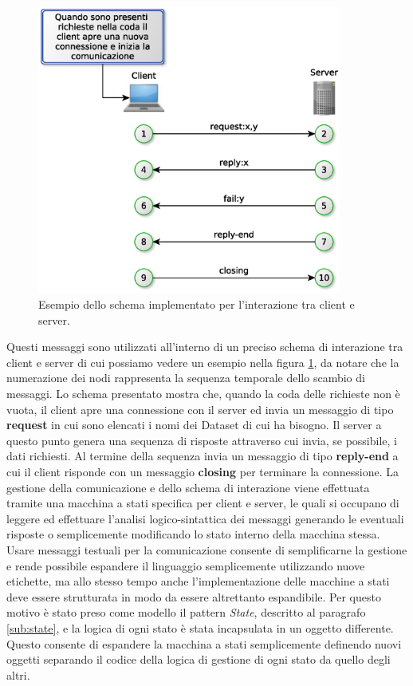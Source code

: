 \begin{figure}[t]
\begin{center}
\includegraphics[width=10cm]{Immagini/InterazioniClientServer}
\caption{Esempio dello schema implementato per l'interazione tra client e server.\label{f:clientserverinteraction}} 
\end{center} 
\end{figure}

Questi messaggi sono utilizzati all'interno di un preciso schema di interazione tra client e server di cui possiamo vedere un esempio nella figura \ref{f:clientserverinteraction}, da notare che la numerazione dei nodi rappresenta la sequenza temporale dello scambio di messaggi. Lo schema presentato mostra che, quando la coda delle richieste non \`e vuota, il client apre una connessione con il server ed invia un messaggio di tipo \textbf{request} in cui sono elencati i nomi dei Dataset di cui ha bisogno. Il server a questo punto genera una sequenza di risposte attraverso cui invia, se possibile, i dati richiesti. Al termine della sequenza invia un messaggio di tipo \textbf{reply-end} a cui il client risponde con un messaggio \textbf{closing} per terminare la connessione. La gestione della comunicazione e dello schema di interazione viene effettuata tramite una macchina a stati specifica per client e server, le quali si occupano di leggere ed effettuare l'analisi logico-sintattica dei messaggi generando le eventuali risposte o semplicemente modificando lo stato interno della macchina stessa. 
Usare messaggi testuali per la comunicazione consente di semplificarne la gestione e rende possibile espandere il linguaggio semplicemente utilizzando nuove etichette, ma allo stesso tempo anche l'implementazione delle macchine a stati deve essere strutturata in modo da essere altrettanto espandibile.
Per questo motivo \`e stato preso come modello il pattern \textit{State}, descritto al paragrafo \ref{sub:state}, e la logica di ogni stato \`e stata incapsulata in un oggetto differente. Questo consente di espandere la macchina a stati semplicemente definendo nuovi oggetti separando il codice della logica di gestione di ogni stato da quello degli altri.

